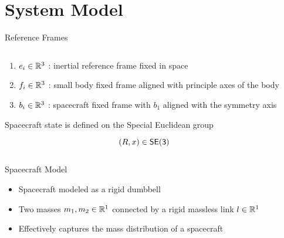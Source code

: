 
\section{System Model}

\begin{frame}{Reference Frames}

    \begin{columns}
        \begin{column}{0.5\textwidth}
            \begin{enumerate}
                \item \( e_i \in \mathbb{R}^3 \) : inertial reference frame fixed in space
                \item \( f_i \in \mathbb{R}^3 \) : small body fixed frame aligned with principle axes of the body
                \item \( b_i \in \mathbb{R}^3 \) : spacecraft fixed frame with \( b_1 \) aligned with the symmetry axis
            \end{enumerate}
            
            \begin{block}{}
                Spacecraft state is defined on the Special Euclidean group

                \[ \left( R, x \right) \in \mathsf{SE(3)} \]
            \end{block}
        \end{column}
        \begin{column}{0.5\textwidth}
            \begin{scaletikzpicturetowidth}{2\columnwidth}
                \resizebox{\columnwidth}{!}{%
                
            }
            \end{scaletikzpicturetowidth}
        \end{column}
    \end{columns}
\end{frame}

\begin{frame}{Spacecraft Model}
    \begin{itemize}
        \item Spacecraft modeled as a rigid dumbbell
        \item Two masses \( m_1, m_2 \in \mathbb{R}^1 \) connected by a rigid massless link \( l \in \mathbb{R}^1\)
        \item Effectively captures the mass distribution of a spacecraft
    \end{itemize}

    \resizebox{\textwidth}{!}{%
        
    }
\end{frame}
